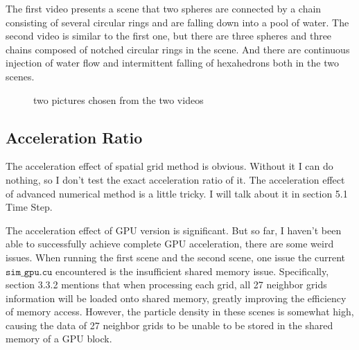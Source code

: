 \documentclass[acmlarge]{acmart}
\begin{document}
The first video presents a scene that two spheres are connected by a chain consisting of several circular rings and 
are falling down into a pool of water. The second video is similar to the first one, but there are three spheres and
three chains composed of notched circular rings in the scene. And there are  
continuous injection of water flow and intermittent falling of hexahedrons both in the two scenes.
\begin{figure}[h]
  \centering
  \caption{two pictures chosen from the two videos}
\end{figure}

\subsection{Acceleration Ratio}
The acceleration effect of spatial grid method is obvious. Without it I can do nothing, so I don't test the 
exact acceleration ratio of it.
The acceleration effect of advanced numerical method is a little tricky. I will talk about it in section 5.1 Time Step.

The acceleration effect of GPU version is significant. But so far, 
I haven't been able to successfully achieve complete GPU acceleration, there are some weird issues. 
When running the first scene and the second scene, one issue the current $\texttt{sim\_gpu.cu}$ encountered is
the insufficient shared memory issue.
Specifically, section 3.3.2 mentions that when processing each grid, 
all 27 neighbor grids information will be loaded onto shared memory, 
greatly improving the efficiency of memory access. 
However, the particle density in these scenes is somewhat high, 
causing the data of 27 neighbor grids to be unable to be stored in the shared memory of a GPU block.
\end{document}
